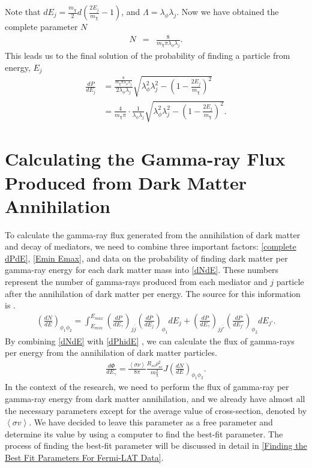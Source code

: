 \documentclass[10pt, oneside]{book}
\numberwithin{equation}{chapter}
\begin{document}
Note that $dE_j = \frac{m_\chi}{2}d\left(\frac{2E_j}{m_\chi}-1\right)$, and $\Lambda=\lambda_\phi \lambda_j$. Now we have obtained the complete parameter $N$
\begin{eqnarray}
    N &=& \frac{8}{m_\chi\pi\lambda_\phi\lambda_j}.
\end{eqnarray}
This leads us to the final solution of the probability of finding a particle from  energy, $E_j$
\begin{equation}\label{complete dPdE}
\begin{aligned}
    \frac{dP}{dE_j} &= \frac{\frac{8}{m_\chi\pi\lambda_\phi\lambda_j}}{2\lambda_\phi\lambda_j}\sqrt{\lambda_\phi^2\lambda_j^2-\left(1-\frac{2E_j}{m_\chi}\right)^2}\\
    &= \frac{4}{m_\chi\pi}\cdot\frac{1}{\lambda_\phi\lambda_j}\sqrt{\lambda_\phi^2\lambda_j^2-\left(1-\frac{2E_j}{m_\chi}\right)^2}.
\end{aligned}
\end{equation}

\section{Calculating the Gamma-ray Flux Produced from Dark Matter Annihilation}
To calculate the gamma-ray flux generated from the annihilation of dark matter and decay of mediators, we need to combine three important factors: \autoref{complete dPdE}, \autoref{Emin Emax}, and data on the probability of finding dark matter per gamma-ray energy for each dark matter mass into \autoref{dNdE}. These numbers represent the number of gamma-rays produced from each mediator and $j$ particle after the annihilation of dark matter per energy. The source for this information is \cite{Klangburam:2021vli}.
\begin{eqnarray}\label{dNdE}
    \left(\frac{dN}{dE}\right)_{\phi_1\phi_2}=\int_{E_{min}}^{E_{max}}\left(\frac{dP}{dE_\gamma}\right)_{j\bar{j}}\left(\frac{dP}{dE_j}\right)_{\phi_1}dE_j + \left(\frac{dP}{dE_\gamma}\right)_{j\bar{j'}}\left(\frac{dP}{dE_{j'}}\right)_{\phi_2}dE_{j'}.
\end{eqnarray}
By combining \autoref{dNdE} with \autoref{dPhidE} \cite{Klangburam:2021vli}, we can calculate the flux of gamma-rays per energy from the annihilation of dark matter particles.
\begin{eqnarray}\label{dPhidE}
	\frac{d\Phi}{dE_\gamma}=\frac{\left\langle\sigma\nu\right\rangle}{8\pi}\frac{R_{sc}\rho_{sc}^2}{m_\chi^2}J\left(\frac{dN}{dE}\right)_{\phi_1\phi_2}.
\end{eqnarray}
In the context of the research, we need to perform the flux of gamma-ray per gamma-ray energy from dark matter annihilation, and we already have almost all the necessary parameters except for the average value of cross-section, denoted by $\left<\sigma v\right>$. We have decided to leave this parameter as a free parameter and determine its value by using a computer to find the best-fit parameter. The process of finding the best-fit parameter will be discussed in detail in \autoref{Finding the Best Fit Parameters For Fermi-LAT Data}.
\end{document}
